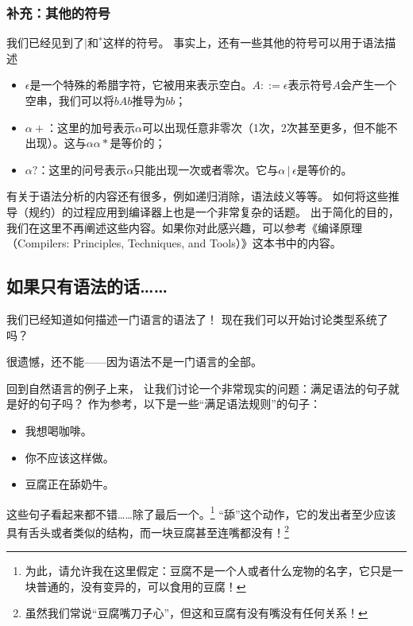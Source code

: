 \documentclass[../main.tex]{subfiles}
\begin{document}
  \subsubsection*{补充：其他的符号}
    \indent 我们已经见到了$|$和${}^*$这样的符号。
    事实上，还有一些其他的符号可以用于语法描述

    \begin{itemize}
      \item $\epsilon$是一个特殊的希腊字符，它被用来表示空白。$A ::= \epsilon$表示符号$A$会产生一个空串，我们可以将$bAb$推导为$bb$；
      \item $\alpha+$：这里的加号表示$\alpha$可以出现任意非零次（1次，2次甚至更多，但不能不出现）。这与$\alpha\alpha*$是等价的；
      \item $\alpha?$：这里的问号表示$\alpha$只能出现一次或者零次。它与$\alpha\,|\,\epsilon$是等价的。
    \end{itemize}

    \indent 

  \indent 有关于语法分析的内容还有很多，例如递归消除，语法歧义等等。
  如何将这些推导（规约）的过程应用到编译器上也是一个非常复杂的话题。
  出于简化的目的，我们在这里不再阐述这些内容。如果你对此感兴趣，可以参考《编译原理（Compilers: Principles, Techniques, and Tools）》这本书中的内容。

  \subsection{如果只有语法的话……}
  \indent 我们已经知道如何描述一门语言的语法了！
  现在我们可以开始讨论类型系统了吗？

  \indent 很遗憾，还不能——因为语法不是一门语言的全部。

  \indent 回到自然语言的例子上来，
  让我们讨论一个非常现实的问题：满足语法的句子就是好的句子吗？
  作为参考，以下是一些“满足语法规则”的句子：

  \begin{itemize}
    \item 我想喝咖啡。
    \item 你不应该这样做。
    \item 豆腐正在舔奶牛。
  \end{itemize}

  \indent 这些句子看起来都不错……除了最后一个。\footnote[1]{为此，请允许我在这里假定：豆腐不是一个人或者什么宠物的名字，它只是一块普通的，没有变异的，可以食用的豆腐！}
  “舔”这个动作，它的发出者至少应该具有舌头或者类似的结构，而一块豆腐甚至连嘴都没有！\footnote[2]{虽然我们常说“豆腐嘴刀子心”，但这和豆腐有没有嘴没有任何关系！}
\end{document}
